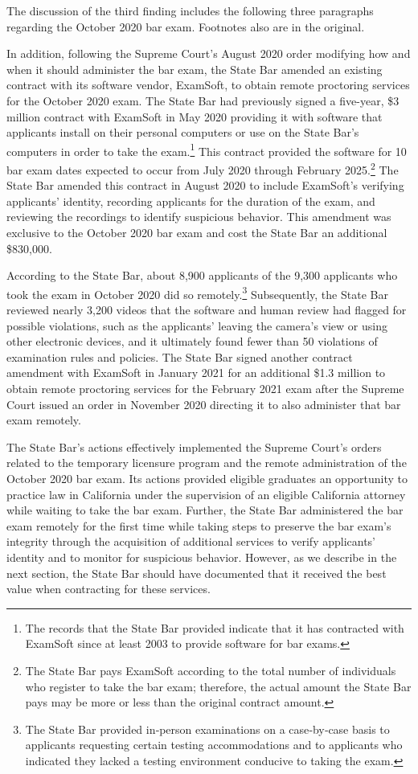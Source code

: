 The discussion of the third finding includes the following three paragraphs
regarding the October 2020 bar exam. Footnotes also are in the original.

\sectionbreak

\noindent{}In addition, following the Supreme Court's August 2020 order
modifying how and when it should administer the bar exam, the State Bar amended
an existing contract with its software vendor, ExamSoft, to obtain remote
proctoring services for the October 2020 exam. The State Bar had previously
signed a five-year, \$3 million contract with ExamSoft in May 2020 providing it
with software that applicants install on their personal computers or use on the
State Bar's computers in order to take the exam.\footnote{The records that the
State Bar provided indicate that it has contracted with ExamSoft since at least
2003 to provide software for bar exams.} This contract provided the software for
10 bar exam dates expected to occur from July 2020 through February
2025.\footnote{The State Bar pays ExamSoft according to the total number of
individuals who register to take the bar exam; therefore, the actual amount the
State Bar pays may be more or less than the original contract amount.} The State
Bar amended this contract in August 2020 to include ExamSoft's verifying
applicants' identity, recording applicants for the duration of the exam, and
reviewing the recordings to identify suspicious behavior. This amendment was
exclusive to the October 2020 bar exam and cost the State Bar an additional
\$830,000.

According to the State Bar, about 8,900 applicants of the 9,300 applicants who
took the exam in October 2020 did so remotely.\footnote{The State Bar provided
in‑person examinations on a case‑by‑case basis to applicants requesting certain
testing accommodations and to applicants who indicated they lacked a testing
environment conducive to taking the exam.} Subsequently, the State Bar reviewed
nearly 3,200 videos that the software and human review had flagged for possible
violations, such as the applicants' leaving the camera's view or using other
electronic devices, and it ultimately found fewer than 50 violations of
examination rules and policies. The State Bar signed another contract amendment
with ExamSoft in January 2021 for an additional \$1.3 million to obtain remote
proctoring services for the February 2021 exam after the Supreme Court issued an
order in November 2020 directing it to also administer that bar exam remotely.

The State Bar's actions effectively implemented the Supreme Court's orders
related to the temporary licensure program and the remote administration of the
October 2020 bar exam. Its actions provided eligible graduates an opportunity to
practice law in California under the supervision of an eligible California
attorney while waiting to take the bar exam. Further, the State Bar administered
the bar exam remotely for the first time while taking steps to preserve the bar
exam's integrity through the acquisition of additional services to verify
applicants' identity and to monitor for suspicious behavior. However, as we
describe in the next section, the State Bar should have documented that it
received the best value when contracting for these services.
